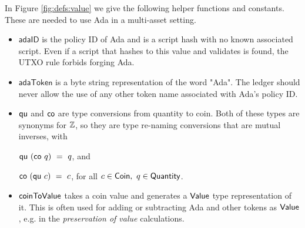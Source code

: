 In Figure \ref{fig:defs:value} we give the following helper functions
and constants.  These are needed to use Ada in a multi-asset setting.

\begin{itemize}
  \item $\mathsf{adaID}$ is the policy ID of Ada and is a script hash with no known associated
  script. Even if a script that hashes to this value
  and validates is found, the UTXO rule forbids forging Ada.
  \item $\mathsf{adaToken}$ is a byte string representation of the word "Ada".
  The ledger should never allow the use of any other token name associated
  with Ada's policy ID.
\item $\mathsf{qu}$ and $\mathsf{co}$ are type conversions from quantity to
  coin. Both of these types are synonyms for $\mathbb{Z}$, so they are
  type re-naming conversions that are mutual inverses, with

  $\mathsf{qu} ~(\mathsf{co} ~q )~= ~q$, and

  $\mathsf{co}~ (\mathsf{qu}~ c) ~=~ c$, for all $c \in \mathsf{Coin},~q \in \mathsf{Quantity}$.

  \item $\mathsf{coinToValue}$ takes a coin value and generates a $\mathsf{Value}$ type representation
  of it. This is often used for adding or subtracting Ada and other tokens as $\mathsf{Value}$, e.g. in the
  \emph{preservation of value} calculations.
\end{itemize}
